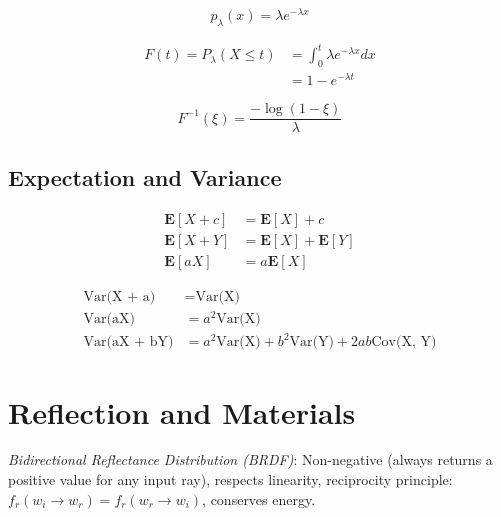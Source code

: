 \documentclass[10pt,landscape]{article}
\newcommand{\expect}[1]{\mathbf{E}[#1]}
\newcommand{\var}[1]{\text{Var(#1)}}
\newcommand{\cov}[1]{\text{Cov(#1)}}
\begin{document}
\begin{multicols}{3}
$$p_\lambda(x) = \lambda e^{-\lambda x}$$

$$\begin{aligned}
F(t) = P_\lambda(X \le t) &= \int_0^t \lambda e^{-\lambda x} dx \\
                          &= 1 - e^{-\lambda t}
\end{aligned}$$

$$F^{-1}(\xi) = \frac{-\log(1 - \xi)}{\lambda}$$

\subsection{Expectation and Variance}

\begin{align*}
    \expect{X + c} &= \expect{X} + c \\
    \expect{X + Y} &= \expect{X} + \expect{Y} \\
    \expect{aX} &= a\expect{X}
\end{align*}

\begin{align*}
    \var{X + a} &= \var{X} \\
    \var{aX} &= a^2 \var{X} \\
    \var{aX + bY} &= a^2 \var{X} + b^2 \var{Y} + 2ab \cov{X, Y}
\end{align*}


\section{Reflection and Materials}

\textit{Bidirectional Reflectance Distribution (BRDF)}: Non-negative (always returns a positive value for any input ray), respects linearity, reciprocity principle: $f_r(w_i \rightarrow w_r) = f_r(w_r \rightarrow w_i)$, conserves energy.


\end{multicols}
\end{document}
